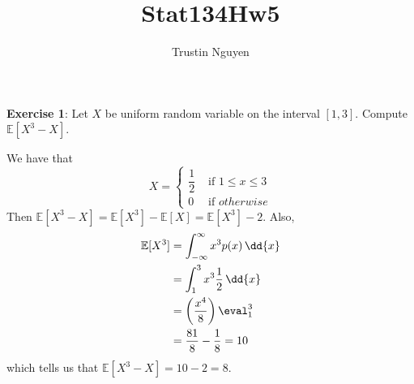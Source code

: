 \documentclass{article}
\title{Stat134Hw5}
\author{Trustin Nguyen}
\begin{document}
    \maketitle

\reversemarginpar

\textbf{Exercise 1}: Let $X$ be uniform random variable on the interval $[1, 3]$. Compute $\mathbb{E}[X^{3} - X]$.
    \begin{answer}
        We have that 
            \begin{equation*}
                X = \begin{cases}
                    \dfrac{1}{2} &\text{ if } 1 \leq x \leq 3 \\
                    0 &\text{ if } otherwise      
                \end{cases}
            \end{equation*}
        Then $\mathbb{E}[X^{3} - X] = \mathbb{E}[X^{3}] - \mathbb{E}[X] = \mathbb{E}[X^{3}] - 2$. Also, 
            \begin{align*}
                \mathbb{E}[X^{3}] &= \int_{-\infty}^{\infty} x^{3}p(x) \, \dd{x}  \\
                                  &= \int_{1}^{3} x^{3}\dfrac{1}{2} \, \dd{x}     \\
                                  &= \left(\dfrac{x^{4}}{8}\right)\eval_{1}^{3}   \\
                                  &= \dfrac{81}{8} - \dfrac{1}{8} = 10              
            \end{align*}
        which tells us that $\mathbb{E}[X^{3} - X] = 10 - 2 = 8$.
    \end{answer}

\newpage
\end{document}
